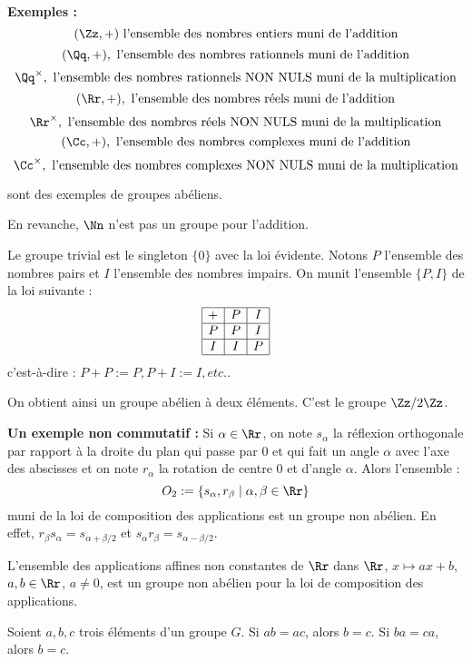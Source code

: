 \documentclass[class=report,crop=false]{standalone}
\begin{document}
{\bf Exemples :} \[ (\Zz,+) \mbox{ l'ensemble des nombres entiers muni de l'addition}\]
\[(\Qq,+), \mbox{ l'ensemble des nombres rationnels muni de l'addition}\]
\[\Qq^\times, \mbox{ l'ensemble des nombres rationnels NON NULS  muni de la multiplication}\]
\[(\Rr,+) , \mbox{ l'ensemble des nombres réels muni de l'addition}\]
\[\Rr^\times , \mbox{ l'ensemble des nombres réels NON NULS  muni de la multiplication}\]
\[(\Cc,+), \mbox{ l'ensemble des nombres complexes muni de l'addition}\]
\[\Cc^\times, \mbox{ l'ensemble des nombres complexes NON NULS  muni de la multiplication} \]

sont des exemples de groupes abéliens. 

En revanche, $\Nn$ n'est pas un groupe pour l'addition.

Le groupe trivial est le singleton $\{0\}$ avec la loi évidente. Notons $P$ l'ensemble des nombres pairs et $I$ l'ensemble des nombres impairs. On munit l'ensemble $\{P,I\}$ de la loi suivante :
\[\begin{array}{|c|c|c|}
\hline
+&P&I\\
\hline
P&P&I\\
\hline
I&I&P\\
\hline
\end{array}\]
c'est-à-dire : $P+P := P, P+I := I,etc.$.

On obtient ainsi un groupe abélien à deux éléments. C'est le groupe $\Zz/ 2\Zz$.

{\bf Un exemple non commutatif :} Si $\alpha \in \Rr$, on note $s_\alpha$ la réflexion orthogonale par rapport à la droite du plan qui passe par $0$ et qui fait un angle $\alpha$ avec l'axe des abscisses et on note $r_\alpha$ la rotation de centre $0$ et d'angle $\alpha$. Alors l'ensemble :
\[O_2:=\{s_\alpha,r_\beta \mid \alpha,\beta \in \Rr\}\]
muni de la loi de composition des applications est un groupe non abélien. En effet, $r_\beta s_\alpha = s_{\alpha +\beta/2}$ et $s_\alpha r_\beta = s_{\alpha-\beta/2}$. 

\begin{exercicecours}
L'ensemble des applications affines non constantes de $\Rr$ dans $\Rr$, $x \mapsto ax+b$, $a , b \in \Rr$, $a \neq 0$, est un groupe non abélien pour la loi de composition des applications.
\end{exercicecours}

\begin{proposition}
Soient $a,b,c$ trois éléments d'un groupe $G$. Si $ab=ac$, alors $b=c$. Si $ba = ca$, alors $b=c$.
\end{proposition}
\end{document}
